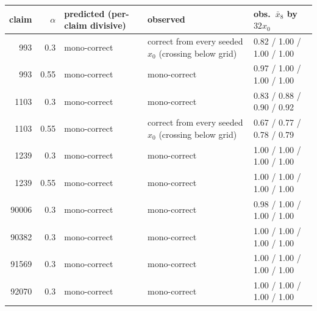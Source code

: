 \begin{tabular}{rrlll}
\toprule
claim & $\alpha$ & predicted (per-claim divisive) & observed & obs.\ $\bar x_8$ by $32x_0$ \\
\midrule
993 & 0.3 & mono-correct & correct from every seeded $x_0$ (crossing below grid) & 0.82 / 1.00 / 1.00 / 1.00 \\
993 & 0.55 & mono-correct & mono-correct & 0.97 / 1.00 / 1.00 / 1.00 \\
1103 & 0.3 & mono-correct & mono-correct & 0.83 / 0.88 / 0.90 / 0.92 \\
1103 & 0.55 & mono-correct & correct from every seeded $x_0$ (crossing below grid) & 0.67 / 0.77 / 0.78 / 0.79 \\
1239 & 0.3 & mono-correct & mono-correct & 1.00 / 1.00 / 1.00 / 1.00 \\
1239 & 0.55 & mono-correct & mono-correct & 1.00 / 1.00 / 1.00 / 1.00 \\
90006 & 0.3 & mono-correct & mono-correct & 0.98 / 1.00 / 1.00 / 1.00 \\
90382 & 0.3 & mono-correct & mono-correct & 1.00 / 1.00 / 1.00 / 1.00 \\
91569 & 0.3 & mono-correct & mono-correct & 1.00 / 1.00 / 1.00 / 1.00 \\
92070 & 0.3 & mono-correct & mono-correct & 1.00 / 1.00 / 1.00 / 1.00 \\
\bottomrule
\end{tabular}

